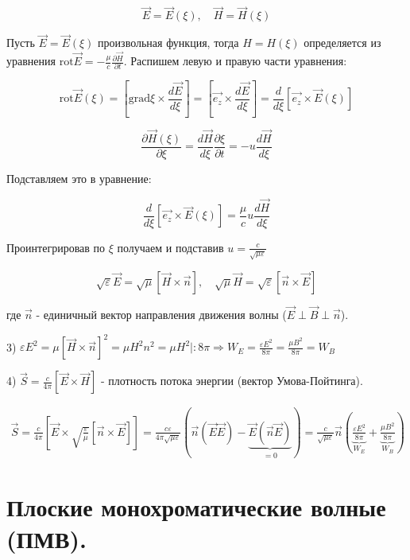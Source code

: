 \documentclass[12pt, a4paper]{report}
\begin{document}
\[ \vec{E}= \vec{E}(\xi ) , \quad \vec{H}=\vec{H}(\xi ) \] 

Пусть \( \vec{E}= \vec{E}(\xi ) \)  произвольная функция, тогда  \(  H=H(\xi ) \) определяется из уравнения \( \displaystyle \mathrm{rot}\vec{E}= - \frac{\mu}{c} \frac{\partial \vec{H}}{\partial t}    \). Распишем левую и правую части уравнения:

\[ \mathrm{rot} \vec{E}(\xi )= \left[ \mathrm{grad} \xi \times  \frac{d \vec{E}}{d \xi }     \right]= [\vec{e_z}\times \frac{d \vec{E}}{d \xi }] = \frac{d}{d \xi  } [\vec{e_z}\times  \vec{E}(\xi )]   \] 

\[ \frac{\partial \vec{H}(\xi )}{\partial\xi }= \frac{d \vec{H}}{d\xi } \frac{\partial \xi }{\partial t}   = - u \frac{d \vec{H}}{d \xi } \] 

Подставляем это в уравнение:

\[ 
\frac{d}{d \xi} [\vec{e_z} \times \vec{E}(\xi)] = \frac{\mu}{c} u \frac{d \vec{H}}{d \xi} 
\]

Проинтегрировав по \( \xi \) получаем и подставив \( \displaystyle u=\frac{c}{\sqrt{\mu \varepsilon }} \) 


\[ \displaystyle  \sqrt{\varepsilon} \vec{E} = \sqrt{ \mu} [\vec{H}\times \vec{n}], \quad \sqrt{\mu} \vec{H} = \sqrt{ \varepsilon} [\vec{n}\times \vec{E}] \]

где \( \vec{n } \) - единичный вектор направления движения волны (\(  \vec{E} \perp \vec{B} \perp \vec{n} \)). 

3) \( \displaystyle \varepsilon E ^2 = \mu [ \displaystyle \vec{H}\times  \vec{n }] ^2 = \mu H ^2 n ^2 = \mu H ^2 | : 8 \pi \Rightarrow W_E = \frac{\varepsilon E ^2 }{8 \pi} =\frac{\mu B ^2 }{8 \pi} = W_B  \) 

4) \( \displaystyle \vec{S}= \frac{c}{4 \pi}   [ \vec{E}\times \vec{H }] \) - плотность потока энергии (вектор Умова-Пойтинга). 

\begin{gather*}
    \displaystyle \vec{S} = \frac{c}{4 \pi} [\vec{E } \times  \sqrt{\frac{\varepsilon}{\mu} }[\vec{n }\times  \vec{E}]]= \frac{c \varepsilon}{4 \pi \sqrt{ \mu \varepsilon}} \left( \vec{n}( \vec{E}\vec{E}) - \underbrace{\vec{E}( \vec{n }\vec{E})}_{=0}   \right)= \frac{c}{\sqrt{ \mu \varepsilon}} \vec{n} \left( \underbrace{\frac{\varepsilon E ^2 }{8 \pi}}_{W_E}  +\underbrace{\frac{\mu B ^2 }{8 \pi}  }_{W_B}  \right)   
\end{gather*}

\section{Плоские монохроматические волные (ПМВ).}
\end{document}
